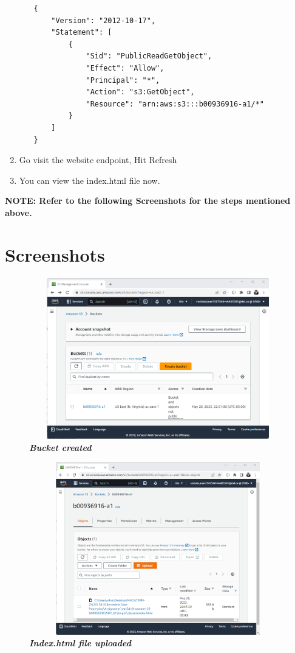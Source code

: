 \begin{enumerate}
\begin{enumerate}
                \begin{lstlisting}
{
    "Version": "2012-10-17",
    "Statement": [
        {
            "Sid": "PublicReadGetObject",
            "Effect": "Allow",
            "Principal": "*",
            "Action": "s3:GetObject",
            "Resource": "arn:aws:s3:::b00936916-a1/*"
        }
    ]
}

\end{lstlisting}

        \end{enumerate}
        \item Go visit the website endpoint, Hit Refresh
        \item You can view the index.html file now. 
        
\end{enumerate}
\textbf{ NOTE: Refer to the following Screenshots for the steps mentioned above.
}\chapter{Screenshots}

\begin{figure}[htp]
    \centering
    \includegraphics[scale=1, width=15cm,height=7cm]{PROBLEM 2/Snaps/2. Bucket created.png}
    \caption{\textbf{\textit{Bucket created}}}
    \label{fig:bucket_created}
\end{figure}

\begin{figure}[htp]
    \centering
    \includegraphics[scale=1, width=15cm,height=7.5cm]{PROBLEM 2/Snaps/3. File uploaded.png}
    \caption{\textbf{\textit{Index.html file uploaded }}}
    \label{fig:index_file_uploaded}
\end{figure}

